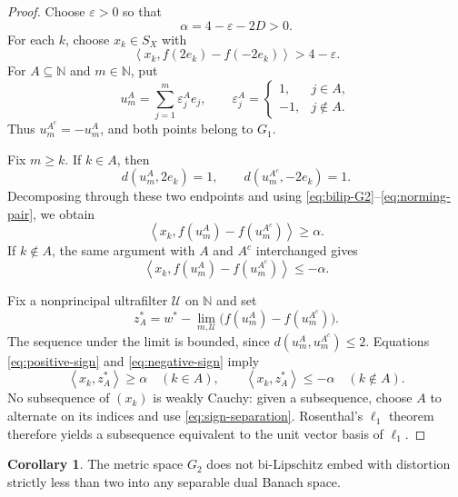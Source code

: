 \documentclass[11pt]{amsart}
\theoremstyle{definition}
\newtheorem{corollary}[theorem]{Corollary}
\newcommand{\angles}[1]{\left\langle#1\right\rangle}
\def\N{{\mathbb N}}
\begin{document}
\begin{proof}
Choose $\varepsilon>0$ so that
$$
       \alpha=4-\varepsilon-2D>0.
$$
For each $k$, choose $x_k\in S_X$ with
\begin{equation}\label{eq:norming-pair}
       \angles{x_k,f(2e_k)-f(-2e_k)}>4-\varepsilon.
\end{equation}
For $A\subseteq\N$ and $m\in\N$, put
$$
 u_m^A=\sum_{j=1}^m\varepsilon_j^A e_j,
 \qquad
 \varepsilon_j^A=
 \begin{cases}
  1,&j\in A,\\
 -1,&j\notin A.
 \end{cases}
$$
Thus $u_m^{A^c}=-u_m^A$, and both points belong to $G_1$.

Fix $m\geq k$.  If $k\in A$, then
$$
       d(u_m^A,2e_k)=1,
       \qquad
       d(u_m^{A^c},-2e_k)=1.
$$
Decomposing through these two endpoints and using
\eqref{eq:bilip-G2}--\eqref{eq:norming-pair}, we obtain
\begin{equation}\label{eq:positive-sign}
       \angles{x_k,f(u_m^A)-f(u_m^{A^c})}\geq\alpha.
\end{equation}
If $k\notin A$, the same argument with $A$ and $A^c$ interchanged gives
\begin{equation}\label{eq:negative-sign}
       \angles{x_k,f(u_m^A)-f(u_m^{A^c})}\leq-\alpha.
\end{equation}

Fix a nonprincipal ultrafilter $\mathcal U$ on $\N$ and set
$$
       z_A^*=w^*-\lim_{m,\mathcal U}
             \bigl(f(u_m^A)-f(u_m^{A^c})\bigr).
$$
The sequence under the limit is bounded, since
$d(u_m^A,u_m^{A^c})\leq2$.  Equations
\eqref{eq:positive-sign} and \eqref{eq:negative-sign} imply
\begin{equation}\label{eq:sign-separation}
 \angles{x_k,z_A^*}\geq\alpha\quad(k\in A),
 \qquad
 \angles{x_k,z_A^*}\leq-\alpha\quad(k\notin A).
\end{equation}
No subsequence of $(x_k)$ is weakly Cauchy: given a subsequence, choose $A$ to
alternate on its indices and use \eqref{eq:sign-separation}.  Rosenthal's
$\ell_1$ theorem \cite{Rosenthal} therefore yields a subsequence equivalent to
the unit vector basis of $\ell_1$.
\end{proof}

\begin{corollary}\label{cor:G2-sep-dual}
The metric space $G_2$ does not bi-Lipschitz embed with distortion strictly less than two
into any separable dual Banach space.
\end{corollary}
\end{document}
